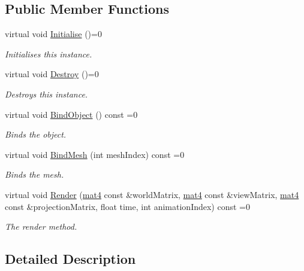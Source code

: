 \subsection*{Public Member Functions}
\begin{DoxyCompactItemize}
\item 
virtual void \hyperlink{class_i_renderable_object_a2d52e4ff9309bfa2f1ae1905d67d8691}{Initialise} ()=0
\begin{DoxyCompactList}\small\item\em Initialises this instance. \end{DoxyCompactList}\item 
virtual void \hyperlink{class_i_renderable_object_a07941bb2f71252ce61bc007bb41e44c7}{Destroy} ()=0
\begin{DoxyCompactList}\small\item\em Destroys this instance. \end{DoxyCompactList}\item 
virtual void \hyperlink{class_i_renderable_object_ab44c017819f2e57a9b4b4ba40961d9eb}{Bind\+Object} () const  =0
\begin{DoxyCompactList}\small\item\em Binds the object. \end{DoxyCompactList}\item 
virtual void \hyperlink{class_i_renderable_object_ac0db472961e13dbbdc5cd36f14a87fae}{Bind\+Mesh} (int mesh\+Index) const  =0
\begin{DoxyCompactList}\small\item\em Binds the mesh. \end{DoxyCompactList}\item 
virtual void \hyperlink{class_i_renderable_object_a6f47f692684ec70b5b776c0884495059}{Render} (\hyperlink{_types_8h_a2db59f395fe82a7394c6324956c265d8}{mat4} const \&world\+Matrix, \hyperlink{_types_8h_a2db59f395fe82a7394c6324956c265d8}{mat4} const \&view\+Matrix, \hyperlink{_types_8h_a2db59f395fe82a7394c6324956c265d8}{mat4} const \&projection\+Matrix, float time, int animation\+Index) const  =0
\begin{DoxyCompactList}\small\item\em The render method. \end{DoxyCompactList}\end{DoxyCompactItemize}


\subsection{Detailed Description}


